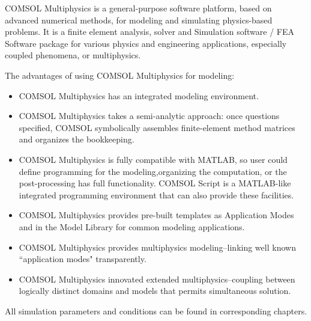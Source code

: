 COMSOL Multiphysics is a general-purpose software platform, based on advanced numerical methods, for modeling and simulating physics-based problems. It is a finite element analysis, solver and Simulation software / FEA Software package for various physics and engineering applications, especially coupled phenomena, or multiphysics.

The advantages of using COMSOL Multiphysics for modeling:
\begin{itemize}
	\item COMSOL Multiphysics has an integrated modeling environment.
	\item COMSOL Multiphysics takes a semi-analytic approach: once questions specified, COMSOL symbolically assembles finite-element method matrices and organizes the bookkeeping.
	\item COMSOL Multiphysics is fully compatible with MATLAB, so user could define programming for the modeling,organizing the computation, or the post-processing has full functionality. COMSOL Script is a MATLAB-like integrated programming environment that can also provide these facilities.
	\item COMSOL Multiphysics provides pre-built templates as Application Modes and in the Model Library for common modeling applications.
	\item COMSOL Multiphysics provides multiphysics modeling--linking well known ``application modes" transparently.
	\item COMSOL Multiphysics innovated extended multiphysics--coupling between logically distinct domains and models that permits simultaneous solution.
\end{itemize}

All simulation parameters and conditions can be found in corresponding chapters.

